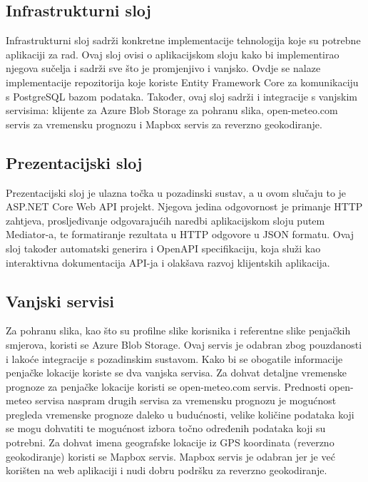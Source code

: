 \subsection{Infrastrukturni sloj}

Infrastrukturni sloj sadrži konkretne implementacije tehnologija koje su potrebne aplikaciji za rad. Ovaj sloj ovisi o aplikacijskom sloju kako bi implementirao njegova sučelja i sadrži sve što je promjenjivo i vanjsko. Ovdje se nalaze implementacije repozitorija koje koriste Entity Framework Core za komunikaciju s PostgreSQL bazom podataka. Također, ovaj sloj sadrži i integracije s vanjskim servisima: klijente za Azure Blob Storage za pohranu slika, open-meteo.com servis za vremensku prognozu i Mapbox servis za reverzno geokodiranje.

\subsection{Prezentacijski sloj}

Prezentacijski sloj je ulazna točka u pozadinski sustav, a u ovom slučaju to je ASP.NET Core Web API projekt. Njegova jedina odgovornost je primanje HTTP zahtjeva, prosljeđivanje odgovarajućih naredbi aplikacijskom sloju putem Mediator-a, te formatiranje rezultata u HTTP odgovore u JSON formatu. Ovaj sloj također automatski generira i OpenAPI specifikaciju, koja služi kao interaktivna dokumentacija API-ja i olakšava razvoj klijentskih aplikacija.


\subsection{Vanjski servisi}

Za pohranu slika, kao što su profilne slike korisnika i referentne slike penjačkih smjerova, koristi se Azure Blob Storage. Ovaj servis je odabran zbog pouzdanosti i lakoće integracije s pozadinskim sustavom. Kako bi se obogatile informacije penjačke lokacije koriste se dva vanjska servisa. Za dohvat detaljne vremenske prognoze za penjačke lokacije koristi se open-meteo.com servis. Prednosti open-meteo servisa naspram drugih servisa za vremensku prognozu je mogućnost pregleda vremenske prognoze daleko u budućnosti, velike količine podataka koji se mogu dohvatiti te mogućnost izbora točno određenih podataka koji su potrebni. Za dohvat imena geografske lokacije iz GPS koordinata (reverzno geokodiranje) koristi se Mapbox servis. Mapbox servis je odabran jer je već korišten na web aplikaciji i nudi dobru podršku za reverzno geokodiranje.

